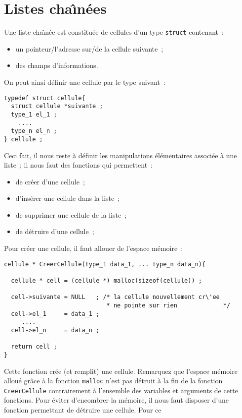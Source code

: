 \documentclass{article}
\begin{document}
\section{Listes cha\^\i{}n\'ees}
\label{sec:ListesChaines}
Une  liste  cha\^\i{}n\'ee est   constitu\'ee de cellules d'un type
\texttt{struct} contenant~:
\begin{itemize}
\item un pointeur/l'adresse sur/de la cellule suivante~;
\item des champs d'informations.
\end{itemize}
On peut ainsi d\'efinir une cellule par le type suivant~:
\begin{verbatim}
typedef struct cellule{
  struct cellule *suivante ;
  type_1 el_1 ;
    .... 
  type_n el_n ;
} cellule ;
\end{verbatim}
Ceci fait,   il     nous  reste  \`a   d\'efinir    les  manipulations
\'el\'ementaires associ\'ee \`a une liste~; il nous faut des fonctions 
qui permettent~:
\begin{itemize}
\item de cr\'eer d'une cellule~;
\item d'ins\'erer une cellule dans la liste~;
\item de supprimer une cellule de la liste~;
\item de d\'etruire d'une cellule~;
\end{itemize}
Pour cr\'eer une cellule, il faut allouer de l'espace m\'emoire~:
\begin{verbatim}
cellule * CreerCellule(type_1 data_1, ... type_n data_n){

  cellule * cell = (cellule *) malloc(sizeof(cellule)) ;

  cell->suivante = NULL   ; /* la cellule nouvellement cr\'ee
                             * ne pointe sur rien             */
  cell->el_1     = data_1 ;
     ....
  cell->el_n     = data_n ;

  return cell ;
}
\end{verbatim}
Cette fonction cr\'ee (et remplit) une cellule. Remarquez que l'espace
m\'emoire allou\'e gr\^ace  \`a la fonction  \texttt{malloc} n'est pas
d\'etruit    \`a   la   fin de    la   fonction  \texttt{CreerCellule}
contrairement  \`a l'ensemble  des   variables et  arguments de  cette
fonctions.  Pour  \'eviter d'encombrer  la   m\'emoire, il nous   faut
disposer d'une fonction permettant de  d\'etruire une cellule. Pour ce
\end{document}
